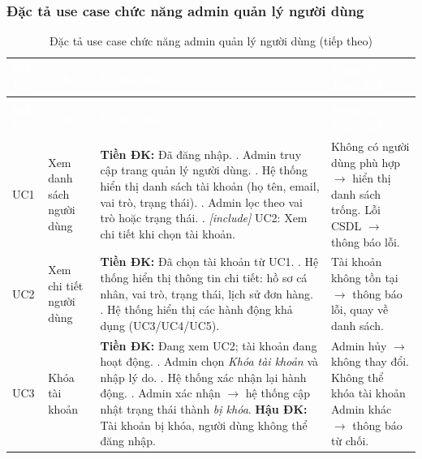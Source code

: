 \subsubsection{Đặc tả use case chức năng admin quản lý người dùng}

\begin{longtable}{|>{\raggedright\arraybackslash}p{2cm}|>{\raggedright\arraybackslash}p{2.5cm}|>{\raggedright\arraybackslash}p{4cm}|>{\raggedright\arraybackslash}p{5.5cm}|}
\caption{Đặc tả use case chức năng admin quản lý người dùng}
\label{tab:uc_admin_user} \\
\hline
\rowcolor{header}\textcolor{white}{\textbf{Mã UC}} & \textcolor{white}{\textbf{Tên}} & \textcolor{white}{\textbf{Luồng chính}} & \textcolor{white}{\textbf{Ngoại lệ / Thay thế}} \\
\hline
\endfirsthead
\caption[]{Đặc tả use case chức năng admin quản lý người dùng (tiếp theo)} \\
\hline
\rowcolor{header}\textcolor{white}{\textbf{Mã UC}} & \textcolor{white}{\textbf{Tên}} & \textcolor{white}{\textbf{Luồng chính}} & \textcolor{white}{\textbf{Ngoại lệ / Thay thế}} \\
\hline
\endhead

UC1 & Xem danh sách người dùng &
  \textbf{Tiền ĐK:} Đã đăng nhập. \newline
  1. Admin truy cập trang quản lý người dùng. \newline
  2. Hệ thống hiển thị danh sách tài khoản (họ tên, email, vai trò, trạng thái). \newline
  3. Admin lọc theo vai trò hoặc trạng thái. \newline
  4. \textit{[include]} UC2: Xem chi tiết khi chọn tài khoản. &
  Không có người dùng phù hợp $\to$ hiển thị danh sách trống. \newline
  Lỗi CSDL $\to$ thông báo lỗi. \\
\hline

UC2 & Xem chi tiết người dùng &
  \textbf{Tiền ĐK:} Đã chọn tài khoản từ UC1. \newline
  1. Hệ thống hiển thị thông tin chi tiết: hồ sơ cá nhân, vai trò, trạng thái, lịch sử đơn hàng. \newline
  2. Hệ thống hiển thị các hành động khả dụng (UC3/UC4/UC5). &
  Tài khoản không tồn tại $\to$ thông báo lỗi, quay về danh sách. \\
\hline

UC3 & Khóa tài khoản &
  \textbf{Tiền ĐK:} Đang xem UC2; tài khoản đang hoạt động. \newline
  1. Admin chọn \textit{Khóa tài khoản} và nhập lý do. \newline
  2. Hệ thống xác nhận lại hành động. \newline
  3. Admin xác nhận $\to$ hệ thống cập nhật trạng thái thành \textit{bị khóa}. \newline
  \textbf{Hậu ĐK:} Tài khoản bị khóa, người dùng không thể đăng nhập. &
  Admin hủy $\to$ không thay đổi. \newline
  Không thể khóa tài khoản Admin khác $\to$ thông báo từ chối. \\
\hline


\end{longtable}
